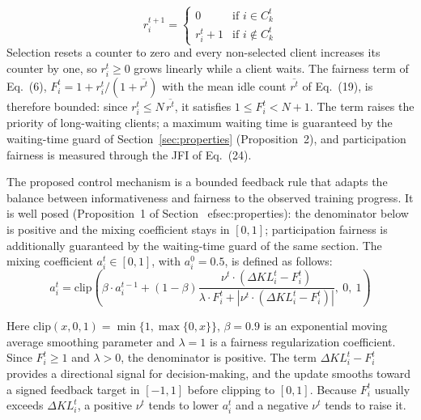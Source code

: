 \documentclass[pdflatex,sn-mathphys-num,oneside]{sn-jnl}%
\theoremstyle{thmstyleone}%
\theoremstyle{thmstyletwo}%
\theoremstyle{thmstylethree}%
\begin{document}
\begin{equation}
r_i^{t+1} =
\begin{cases}
0 & \text{if } i \in C_k^t  \\
r_i^t + 1 & \text{if } i \notin C_k^t
\end{cases}
\label{eq:idle_update}
\end{equation}
Selection resets a counter to zero and every non-selected client increases its counter by one, so $r_i^t\ge 0$ grows linearly while a client waits. The fairness term of Eq.~(6), $F_i^t = 1 + r_i^t/(1+\overline{r^t})$ with the mean idle count $\overline{r^t}$ of Eq.~(19), is therefore bounded: since $r_i^t\le N\,\overline{r^t}$, it satisfies $1 \le F_i^t < N+1$. The term raises the priority of long-waiting clients; a maximum waiting time is guaranteed by the waiting-time guard of Section~\ref{sec:properties} (Proposition~2), and participation fairness is measured through the JFI of Eq.~(24).

The proposed control mechanism is a bounded feedback rule that adapts the balance between informativeness and fairness to the observed training progress. It is well posed (Proposition~1 of Section~
ef{sec:properties}): the denominator below is positive and the mixing coefficient stays in $[0,1]$; participation fairness is additionally guaranteed by the waiting-time guard of the same section. The mixing coefficient $a_i^t \in [0,1]$, with $a_i^0=0.5$, is defined as follows:
\begin{equation}
a_i^t = \mathrm{clip}\left(
\beta \cdot a_i^{t-1} + (1-\beta)
\frac{
\nu^t \cdot (\Delta KL_i^t - F_i^t)
}{
\lambda \cdot F_i^t + \left|\nu^t \cdot (\Delta KL_i^t - F_i^t)\right|
},\ 0,\ 1\right)
\end{equation}

Here $\mathrm{clip}(x,0,1)=\min\{1,\max\{0,x\}\}$, $\beta=0.9$ is an exponential moving average smoothing parameter and $\lambda=1$ is a fairness regularization coefficient. Since $F_i^t \ge 1$ and $\lambda>0$, the denominator is positive. The term $\Delta KL_i^t - F_i^t$ provides a directional signal for decision-making, and the update smooths toward a signed feedback target in $[-1,1]$ before clipping to $[0,1]$. Because $F_i^t$ usually exceeds $\Delta KL_i^t$, a positive $\nu^t$ tends to lower $a_i^t$ and a negative $\nu^t$ tends to raise it.
\end{document}
